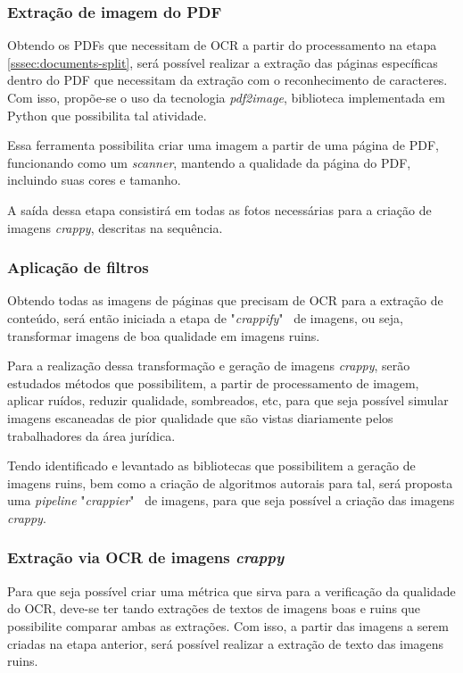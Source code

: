 \subsubsection{Extração de imagem do PDF}

Obtendo os PDFs que necessitam de OCR a partir do processamento na etapa \ref{sssec:documents-split}, será possível realizar a extração das páginas específicas dentro do PDF que necessitam da extração com o reconhecimento de caracteres. Com isso, propõe-se o uso da tecnologia \textit{pdf2image}, biblioteca implementada em Python que possibilita tal atividade.

Essa ferramenta possibilita criar uma imagem a partir de uma página de PDF, funcionando como um \textit{scanner}, mantendo a qualidade da página do PDF, incluindo suas cores e tamanho.

A saída dessa etapa consistirá em todas as fotos necessárias para a criação de imagens \textit{crappy}, descritas na sequência.


\subsubsection{Aplicação de filtros}

Obtendo todas as imagens de páginas que precisam de OCR para a extração de conteúdo, será então iniciada a etapa de "\textit{crappify}" \  de imagens, ou seja, transformar imagens de boa qualidade em imagens ruins.

Para a realização dessa transformação e geração de imagens \textit{crappy}, serão estudados métodos que possibilitem, a partir de processamento de imagem, aplicar ruídos, reduzir qualidade, sombreados, etc, para que seja possível simular imagens escaneadas de pior qualidade que são vistas diariamente pelos trabalhadores da área jurídica.

Tendo identificado e levantado as bibliotecas que possibilitem a geração de imagens ruins, bem como a criação de algoritmos autorais para tal, será proposta uma \textit{pipeline} "\textit{crappier}" \  de imagens, para que seja possível a criação das imagens \textit{crappy}.


\subsubsection{Extração via OCR de imagens \textit{crappy}}

Para que seja possível criar uma métrica que sirva para a verificação da qualidade do OCR, deve-se ter tando extrações de textos de imagens boas e ruins que possibilite comparar ambas as extrações. Com isso, a partir das imagens a serem criadas na etapa anterior, será possível realizar a extração de texto das imagens ruins.

